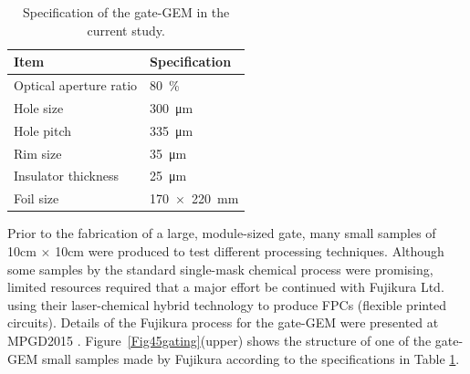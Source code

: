 \begin{table}[]
\begin{center}
\begin{tabular}{|l|l|}
\hline
Item & Specification \\%
\hline
\hline
Optical aperture ratio &  \SI{80}{\percent} \\
Hole size       & \SI{300}{\micro\meter}\\
Hole pitch       & \SI{335}{\micro\meter}\\
Rim size            & \SI{35}{\micro\meter}  \\
Insulator thickness  & \SI{25}{\micro\meter}\\
Foil size            & \SI{170x220}{\milli\meter} \\
\hline
\end{tabular}
\caption{\label{gatespecs} Specification of the gate-GEM in the current study.}
\end{center}
\end{table}

%

Prior to the fabrication of a large, module-sized gate, many small samples of
\unit{10}{cm} $\times$ \unit{10}{cm} were produced to test different processing techniques.
Although some samples by the standard single-mask chemical process were promising, limited resources required that
a major effort be continued with Fujikura Ltd.~\cite{ref5fujikuraltd} using their laser-chemical hybrid technology to produce
FPCs (flexible printed circuits). Details of the Fujikura process for the gate-GEM were presented at MPGD2015 \cite{MPGD2015_gate}.
Figure~\ref{Fig45gating}(upper) shows the structure of one of the gate-GEM small samples made by Fujikura
according to the specifications in Table \ref{gatespecs}.




